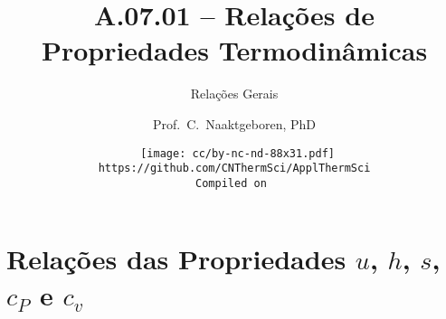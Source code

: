 \makeatletter
\immediate{} %
\makeatother



\title{A.07.01 -- Relações de Propriedades Termodinâmicas}
\subtitle{Relações Gerais}
\author{Prof.~C.~Naaktgeboren, PhD}
\date{{\scriptsize\tt%
    \texttt{[image: cc/by-nc-nd-88x31.pdf]}\\[\smallskipamount]
    https://github.com/CNThermSci/ApplThermSci\\
    Compiled on 
}}

\frame{\titlepage}

\frame{\tableofcontents}

\section{Relações das Propriedades $u$, $h$, $s$, $c_P$ e $c_v$}

